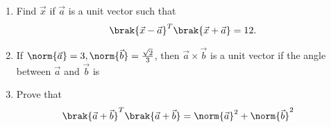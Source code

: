 \begin{enumerate}[label=\arabic*.,ref=\thesubsection.\theenumi]
\item Find $\vec{x}$ if  $\vec{a}$ is a unit vector such that
\begin{align}
\brak{\vec{x}-\vec{a}}^T\brak{\vec{x}+\vec{a}} = 12.
\end{align}
\item If $\norm{\vec{a}} = 3, \norm{\vec{b}} =\frac{\sqrt{2}}{3}$, then $\vec{a}\times \vec{b}$ is a unit vector if the angle between $\vec{a}$ and $\vec{b}$ is 
\begin{enumerate}[itemsep = 2pt]
\end{enumerate}
\item Prove that 
\begin{align}
\brak{\vec{a}+\vec{b}}^T\brak{\vec{a}+\vec{b}} &= \norm{\vec{a}}^2+\norm{\vec{b}}^2


\end{align}
\end{enumerate}
